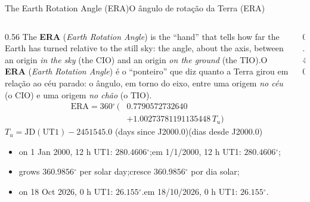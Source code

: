 \documentclass[aspectratio=169,11pt]{beamer}
\newcommand{\tr}[2]{\ifEN#2\else#1\fi}
\newcommand{\bnum}[1]{\textbf{\textcolor{mTeal}{#1}}}
\newcommand{\gr}{\ensuremath{{}^{\circ}}}
\begin{document}
\begin{frame}{\tr{O ângulo de rotação da Terra (ERA)}{The Earth Rotation Angle (ERA)}}
  \begin{columns}[T]
    \begin{column}{0.56\textwidth}
      \small
      \tr{O \bnum{ERA} (\emph{Earth Rotation Angle}) é o ``ponteiro'' que diz quanto a Terra girou em relação ao céu parado: o ângulo, em torno do eixo, entre uma origem \emph{no céu} (o CIO) e uma origem \emph{no chão} (o TIO).}{The \bnum{ERA} (\emph{Earth Rotation Angle}) is the ``hand'' that tells how far the Earth has turned relative to the still sky: the angle, about the axis, between an origin \emph{in the sky} (the CIO) and an origin \emph{on the ground} (the TIO).}
      \[ \begin{aligned} \text{ERA} = 360\gr\,\bigl(&\num{0.7790572732640} \\ &+ \num{1.00273781191135448}\,T_u\bigr) \end{aligned} \]
      {\footnotesize $T_u = \text{JD}(\text{UT1}) - \num{2451545.0}$ \tr{(dias desde J2000.0)}{(days since J2000.0)}}
      \medskip

      \begin{itemize}
        \setlength{\itemsep}{2pt}
        \item \tr{em 1/1/2000, 12 h UT1: $\num{280.4606}\gr$;}{on 1 Jan 2000, 12 h UT1: $\num{280.4606}\gr$;}
        \item \tr{cresce $\num{360.9856}\gr$ por dia solar;}{grows $\num{360.9856}\gr$ per solar day;}
        \item \tr{em 18/10/2026, 0 h UT1: $\num{26.155}\gr$.}{on 18 Oct 2026, 0 h UT1: $\num{26.155}\gr$.}
      \end{itemize}
    \end{column}
    \begin{column}{0.40\textwidth}
      \centering
    \end{column}
  \end{columns}
\end{frame}
\end{document}
